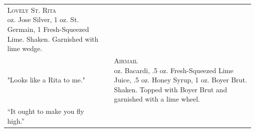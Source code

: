 \documentclass{article}
\makeatletter
\newcommand \Dotfill {\leavevmode \cleaders \hb@xt@ .25em{\hss .\hss }\hfill \kern \z@}%
\makeatother
\begin{document}
{\begin{tabular}{m{}m{}m{}}
{\centering\Huge\textsc{Lovely St. Rita}\\*}
\centering 2 oz. Jose Silver, 1 oz. St. Germain, 1 Fresh-Squeezed Lime. Shaken.  Garnished with lime wedge.\\
\centering\small{"Looks like a Rita to me."}
&
&
{\centering\Huge\textsc{Airmail}\\*}
\centering 2 oz. Bacardi, .5 oz. Fresh-Squeezed Lime Juice, .5 oz. Honey Syrup, 1 oz. Boyer Brut. Shaken. Topped with Boyer Brut and garnished with a lime wheel.\\
\centering\small{“It ought to make you fly high.”}
\end{tabular}
\\\makebox[\columnwidth]{\Huge\Dotfill}

}
\end{document}
